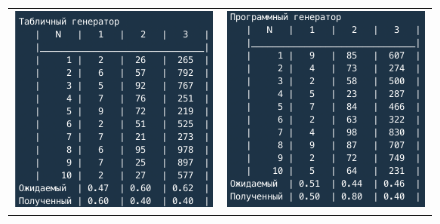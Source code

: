 \documentclass[a4paper,14pt]{extreport} %
\begin{document}
\begin{enumerate}
\begin{figure}[H]\center
	\begin{tabular}{cc}
		\includegraphics[width=80mm]{extable1} & \includegraphics[width=80mm]{exprog1} \\

\end{tabular}
\end{figure}
\end{enumerate}
\end{document}
